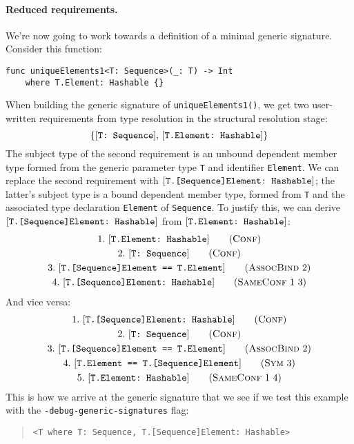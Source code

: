 \documentclass[../generics]{subfiles}
\begin{document}
\paragraph{Reduced requirements.}
We're now going to work towards a definition of a minimal generic signature. Consider this function:
\begin{Verbatim}
func uniqueElements1<T: Sequence>(_: T) -> Int
    where T.Element: Hashable {}
\end{Verbatim}
When building the generic signature of \texttt{uniqueElements1()}, we get two user-written requirements from type resolution in the structural resolution stage:
\[\{[\texttt{T:~Sequence}],\,[\texttt{T.Element:~Hashable}]\}\]
The subject type of the second requirement is an unbound dependent member type formed from the generic parameter type \texttt{T} and identifier \texttt{Element}. We can replace the second requirement with $[\texttt{T.[Sequence]Element:~Hashable}]$; the latter's subject type is a bound dependent member type, formed from \texttt{T} and the associated type declaration \texttt{Element} of \texttt{Sequence}. To justify this, we can derive $[\texttt{T.[Sequence]Element:~Hashable}]$ from $[\texttt{T.Element:~Hashable}]$:
\begin{gather*}
\ConfStep{T.Element}{Hashable}{1}\\
\ConfStep{T}{Sequence}{2}\\
\AssocBindStep{2}{T.[Sequence]Element}{T.Element}{3}\\
\SameConfStep{1}{3}{T.[Sequence]Element}{Hashable}{4}
\end{gather*}
And vice versa:
\begin{gather*}
\ConfStep{T.[Sequence]Element}{Hashable}{1}\\
\ConfStep{T}{Sequence}{2}\\
\AssocBindStep{2}{T.[Sequence]Element}{T.Element}{3}\\
\SymStep{3}{T.Element}{T.[Sequence]Element}{4}\\
\SameConfStep{1}{4}{T.Element}{Hashable}{5}
\end{gather*}
This is how we arrive at the generic signature that we see if we test this example with the \texttt{-debug-generic-signatures} flag:
\begin{quote}
\begin{verbatim}
<T where T: Sequence, T.[Sequence]Element: Hashable>
\end{verbatim}
\end{quote}
\end{document}
